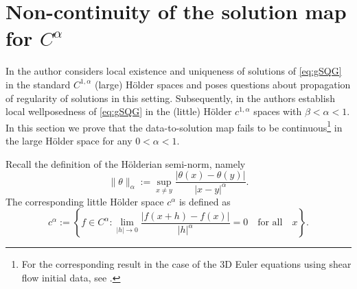 \documentclass[11pt]{amsart}
\numberwithin{equation}{section}
\newtheorem{remark}[theorem]{Remark}
\begin{document}
\section{Non-continuity of the solution map for $C^\alpha$} 
% 

In \cite{I-JJ} the author considers local existence 
and uniqueness of solutions of \eqref{eq:gSQG} 
in the standard $C^{1,\alpha}$ (large) H\"older spaces 
and poses questions about propagation of regularity 
of solutions in this setting. 
Subsequently, in \cite{CJK25} the authors establish 
local wellposedness of \eqref{eq:gSQG} 
in the (little) H\"older $c^{1,\alpha}$ spaces 
with $\beta < \alpha < 1$. 
In this section we prove that 
the data-to-solution map fails 
to be continuous\footnote{For the corresponding 
result in the case of the 3D Euler equations 
using shear flow initial data, see \cite{MY}.}
in the large H\"older space 
for any $0 < \alpha < 1$. 
% 

Recall the definition of the H\"olderian semi-norm, 
namely 
% 
\begin{equation*} 
\|\theta\|_{\alpha}:=\sup_{x\not=y}\frac{|\theta(x) 
- 
\theta(y)|}{|x-y|^\alpha}. 
\end{equation*} 
% 
The corresponding little H\"older space $c^\alpha$ is defined as 
% 
\begin{equation*} 
c^\alpha := 
\left\{ 
f \in C^\alpha: 
\lim_{|h|\to 0} \frac{|f(x+h)-f(x)|}{|h|^\alpha} = 0 
\quad \text{for all} \quad x 
\right\}. 
\end{equation*} 
% 

\end{document}
